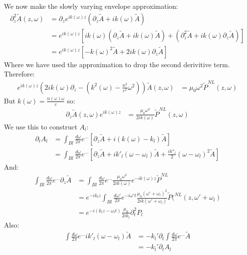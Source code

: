 We now make the slowly varying envelope approximation:
\begin{align*}
	\partial_z^2\tilde{A}(z,\omega) &= \partial_z e^{ik(\omega)z}\left(\partial_z \tilde{A} + ik(\omega)\tilde{A}\right) \\
	&= e^{ik(\omega) z}\left[ik(\omega)(\partial_z \tilde{A} + ik(\omega)\tilde{A}) + (\partial_z^2\tilde{A} + ik(\omega)\partial_z \tilde{A})\right] \\
	&= e^{ik(\omega) z}\left[-k(\omega)^2\tilde{A} + 2ik(\omega)\partial_z \tilde{A}\right]
\end{align*}
Where we have used the approximation to drop the second derivitive term. Therefore:
\begin{align*}
	e^{ik(\omega)z}\left(2ik(\omega)\partial_z -\left(k^2(\omega) - \frac{n^2}{c^2} \omega^2\right)\right)\tilde{A}(z,\omega) &= \mu_0\omega^2\tilde{P}^{NL}(z,\omega)
\end{align*}
But $k(\omega) = \frac{n(\omega)\omega}{c}$ so:
\begin{align*}
	\partial_z \tilde{A}(z,\omega) e^{ik(\omega)z} &= \frac{\mu_0\omega^2}{2ik(\omega)}\tilde{P}^{NL}(z,\omega)
\end{align*}
We use this to construct $A_l$:
\begin{align*}
	\partial_t A_l &= \int_{Bl} \frac{d\omega}{2\pi} e^{\ldots} \left[\partial_z \tilde{A} + i(k(\omega) - k_l)\tilde{A}\right] \\
	&= \int_{Bl} \frac{d\omega}{2\pi} e^{\ldots} \left[\partial_z \tilde{A} + ik'_l(\omega-\omega_l)\tilde{A} + \frac{ik''_l}{2}(\omega-\omega_l)^2\tilde{A}\right]
\end{align*}
And:
\begin{align*}
	\int_{Bl} \frac{d\omega}{2\pi} e^{\ldots} \partial_z \tilde{A} &= \int_{Bl} \frac{d\omega}{2\pi}e^{\ldots} \frac{\mu_0 \omega^2}{2ik(\omega)} e^{-ik(\omega) z} \tilde{P}^{NL} \\
	&= e^{-ik_l z}\int_{Bl} \frac{d\omega'}{2\pi} e^{-i\omega' t} \frac{\mu_0 (\omega' + \omega_l)^2}{2ik(\omega' + \omega_l)} \tilde{P}(^{NL}(z,\omega' + \omega_l) \\
	&= e^{-i(k_lz- \omega_l t)} \frac{\mu_0}{2ik_l} \partial_t^2 P_l
\end{align*}
Also:
\begin{align*}
	\int\frac{d\omega}{2\pi} e^{\ldots} ik'_l(\omega- \omega_l)\tilde{A} &= - k_l'\partial_t \int \frac{d\omega}{2\pi} e^{\ldots} \tilde{A} \\
	&= -k_l'\partial_t A_l
\end{align*}
